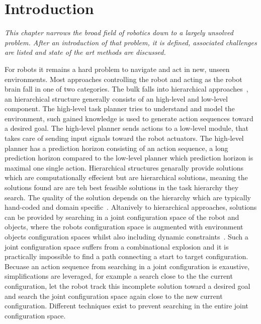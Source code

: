 \chapter{Introduction}%
\label{chap:introduction}
\textit{
This chapter narrows the broad field of robotics down to a largely unsolved problem. After an introduction of that problem, it is defined, associated challenges are listed and state of the art methods are discussed.\bs
}

For robots it remains a hard problem to navigate and act in new, unseen environments. Most approaches controlling the robot and acting as the robot brain fall in one of two categories. The bulk falls into hierarchical approaches~\cite{kaelbling_hierarchical_2011,scholz_navigation_2016,krontiris_dealing_2015}, an hierarchical structure generally consists of an high-level and low-level component. The high-level task planner tries to understand and model the environment, such gained knowledge is used to generate action sequences toward a desired goal. The high-level planner sends actions to a low-level module, that takes care of sending input signals toward the robot actuators. The high-level planner has a prediction horizon consisting of an action sequence, a long prediction horizon compared to the low-level planner which prediction horizon is maximal one single action. Hierarchical structures genarally provide solutions which are computationally effecient but are hierarchical solutions, meaning the solutions found are are teh best feasible solutions in the task hierarchy they search. The quality of the solution depends on the hierarchy which are typically hand-coded and domain specific~\cite{vega-brown_asymptotically_2020}. Altanively to hierarchical approaches, solutions can be provided by searching in a joint configuration space of the robot and objects, where the robots configuration space is augmented with environment objects configuration spaces whilst also including dynamic constraints~\cite{hauser_multimodal_2010,berenson_manipulation_2009,jaillet_path_2013}. Such a joint configuration space suffers from a combinational explosion and it is practically impossible to find a path connecting a start to target configuration. Becuase an action sequence from searching in a joint configuration is exaustive, simplifications are leveraged, for example a search close to the the current configuration, let the robot track this incomplete solution toward a desired goal and search the joint configuration space again close to the new current configuration. Different techniques exist to prevent searching in the entire joint configuration space.\bs

